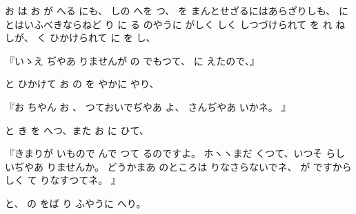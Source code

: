 
お
は
お
が
へる
にも、
しの
へを
つ、
を
まんとせざるにはあらざりしも、
に
とはいふべきならねど
り
に
る
のやうに
がしく
しく
しつづけられて
を
れ
ね
しが、
く
ひかけられて
に
を
し、

『いゝえ
ぢやあ
りませんが
の
でもつて、
に
えたので、』

と
ひかけて
お
の
を
やかに
やり、

『お
ちやん
お
、
つておいでぢやあ
よ、
さんぢやあ
いかネ。
』

と
き
を
へつ、また
お
に
ひて、

『きまりが
いもので
んで
つて
るのですよ。
ホヽヽまだ
くつて、いつそ
らしいぢやあ
りませんか。
どうかまあ
のところは
りなさらないでネ、
が
ですから
しく
て
りなすつてネ。
』

と、
の
をば
り
ふやうに
へり。

